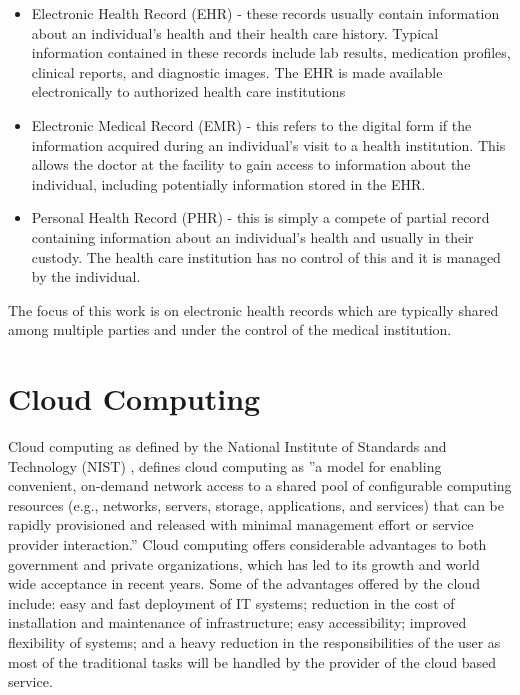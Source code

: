 \begin{itemize}
	
	\item Electronic Health Record (EHR)\cite{caninfoway} - these records usually contain information about an individual's health and their health care history. Typical information contained in these records include lab results, medication profiles, clinical reports, and diagnostic images. The EHR is made available electronically to authorized health care institutions
	
	\item Electronic Medical Record (EMR)\cite{caninfoway} - this refers to the digital form if the information acquired during an individual's visit to a health institution. This allows the doctor at the facility to gain access to information about the individual, including potentially information stored in the EHR.
	
	\item Personal Health Record (PHR)\cite{caninfoway} - this is simply a compete of partial record containing information about an individual's health and usually in their custody. The health care institution has no control of this and it is managed by the individual.
	
\end{itemize}

The focus of this work is on electronic health records which are typically shared among multiple parties and under the control of the medical institution.

\section{Cloud Computing}

Cloud computing as defined by the National Institute of Standards and Technology (NIST) \cite{nist}, defines cloud computing as ''a model for enabling convenient, on-demand network access to a shared pool of configurable computing resources (e.g., networks, servers, storage, applications, and services) that can be rapidly provisioned and released with minimal management effort or service provider interaction.'' Cloud computing offers considerable advantages to both government and private organizations, which has led to its growth and world wide acceptance in recent years. Some of the advantages offered by the cloud include: easy and fast deployment of IT systems; reduction in the cost of installation and maintenance of infrastructure; easy accessibility; improved flexibility of systems; and a heavy reduction in the responsibilities of the user as most of the traditional tasks will be handled by the provider of the cloud based service.

